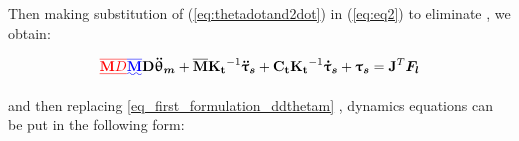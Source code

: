 Then making substitution of (\ref{eq:thetadotand2dot}) in  (\ref{eq:eq2}) to eliminate \DIFdelbegin {}\DIFdelend \DIFaddbegin \DIFadd{$ \vects{\ddot{\uptheta}}$}\DIFaddend , we obtain:

\begin{equation}\DIFdelbegin \DIFdel{
\overline{\vectm{M}  D}}%
\DIFdelend \DIFaddbegin \DIFadd{
\overline{\vectm{M}} }\vectm{ D}\vects{\ddot{\uptheta}_m } \DIFaddend + \DIFdelbegin %
\DIFdelend \DIFaddbegin \overline{\vectm{M}}\vectm{ K_t}\DIFaddend ^{-1} \DIFdelbegin %
\DIFdelend \DIFaddbegin \vects{\ddot{\uptau}_s} \DIFaddend + \DIFaddbegin \vectm{C_t} \DIFaddend \vectm{K_t}^{-1} \DIFdelbegin %
\DIFdelend \DIFaddbegin \vects{\dot{\uptau}_s}  \DIFaddend + \DIFdelbegin %
\DIFdelend \DIFaddbegin \vects{\uptau_s}  \DIFaddend =  \vectm{J}^T \vects{F_l}
\end{equation}

and then replacing \DIFdelbegin {}\DIFdelend \DIFaddbegin {}\eqref{eq_first_formulation_ddthetam} \DIFaddend ,  dynamics equations can be put in the following form:






